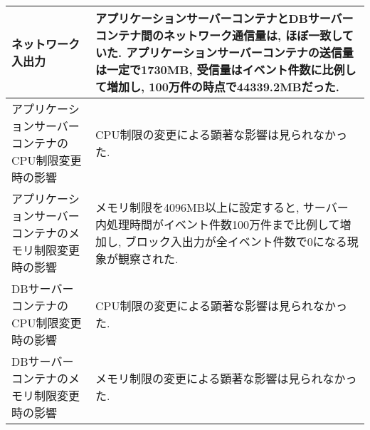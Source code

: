 \documentclass[../../../main]{subfiles}
\begin{document}
\begin{table}[H]
\begin{tabular}{|p{4cm}|p{10cm}|}
            ネットワーク入出力                    & アプリケーションサーバーコンテナとDBサーバーコンテナ間のネットワーク通信量は, ほぼ一致していた. アプリケーションサーバーコンテナの送信量は一定で1730MB, 受信量はイベント件数に比例して増加し, 100万件の時点で44339.2MBだった.  \\ \hline
            アプリケーションサーバーコンテナのCPU制限変更時の影響 & CPU制限の変更による顕著な影響は見られなかった.                                                                                                 \\ \hline
            アプリケーションサーバーコンテナのメモリ制限変更時の影響 & メモリ制限を4096MB以上に設定すると, サーバー内処理時間がイベント件数100万件まで比例して増加し, ブロック入出力が全イベント件数で0になる現象が観察された.                                          \\ \hline
            DBサーバーコンテナのCPU制限変更時の影響       & CPU制限の変更による顕著な影響は見られなかった.                                                                                                 \\ \hline
            DBサーバーコンテナのメモリ制限変更時の影響       & メモリ制限の変更による顕著な影響は見られなかった.                                                                                                 \\ \hline
        \end{tabular}
    \end{table}
\end{document}
